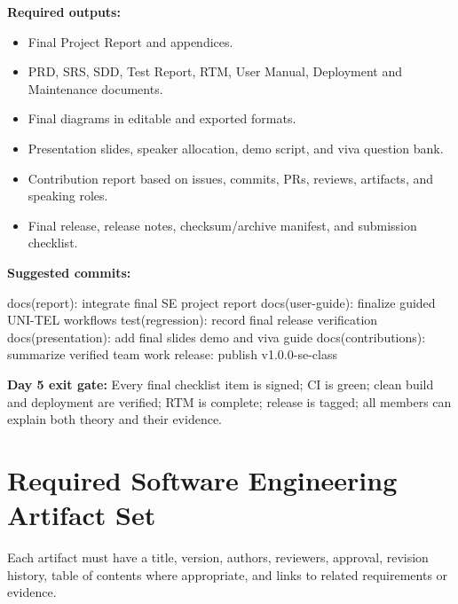 \documentclass[
  10pt,
  a4paper,
  oneside]{report}
\newenvironment{Shaded}{}{}
\newcommand{\NormalTok}[1]{#1}
\providecommand{\tightlist}{%
  \setlength{\itemsep}{0pt}\setlength{\parskip}{0pt}}
\begin{document}
\textbf{Required outputs:}

\begin{itemize}
\tightlist
\item
  Final Project Report and appendices.
\item
  PRD, SRS, SDD, Test Report, RTM, User Manual, Deployment and
  Maintenance documents.
\item
  Final diagrams in editable and exported formats.
\item
  Presentation slides, speaker allocation, demo script, and viva
  question bank.
\item
  Contribution report based on issues, commits, PRs, reviews, artifacts,
  and speaking roles.
\item
  Final release, release notes, checksum/archive manifest, and
  submission checklist.
\end{itemize}

\textbf{Suggested commits:}

\begin{Shaded}
\begin{Highlighting}[]
\NormalTok{docs(report): integrate final SE project report}
\NormalTok{docs(user{-}guide): finalize guided UNI{-}TEL workflows}
\NormalTok{test(regression): record final release verification}
\NormalTok{docs(presentation): add final slides demo and viva guide}
\NormalTok{docs(contributions): summarize verified team work}
\NormalTok{release: publish v1.0.0{-}se{-}class}
\end{Highlighting}
\end{Shaded}

\textbf{Day 5 exit gate:} Every final checklist item is signed; CI is
green; clean build and deployment are verified; RTM is complete; release
is tagged; all members can explain both theory and their evidence.

\chapter{Required Software Engineering Artifact
Set}\label{13-required-software-engineering-artifact-set}

Each artifact must have a title, version, authors, reviewers, approval,
revision history, table of contents where appropriate, and links to
related requirements or evidence.
\end{document}
